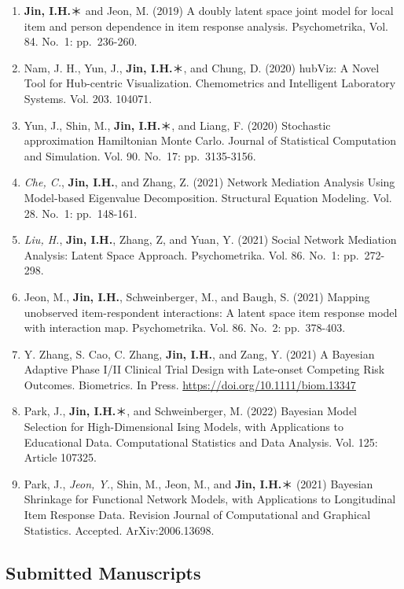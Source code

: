 \documentclass[
]{book}
\begin{document}
\begin{enumerate}
\item
  \textbf{Jin, I.H.}＊ and Jeon, M. (2019) A doubly latent space joint model for local item and person dependence in item response analysis. Psychometrika, Vol. 84. No.~1: pp.~236-260.
\item
  Nam, J. H., Yun, J., \textbf{Jin, I.H.}＊, and Chung, D. (2020) hubViz: A Novel Tool for Hub-centric Visualization. Chemometrics and Intelligent Laboratory Systems. Vol. 203. 104071.
\item
  Yun, J., Shin, M., \textbf{Jin, I.H.}＊, and Liang, F. (2020) Stochastic approximation Hamiltonian Monte Carlo. Journal of Statistical Computation and Simulation. Vol. 90. No.~17: pp.~3135-3156.
\item
  \emph{Che, C.}, \textbf{Jin, I.H.}, and Zhang, Z. (2021) Network Mediation Analysis Using Model-based Eigenvalue Decomposition. Structural Equation Modeling. Vol. 28. No.~1: pp.~148-161.
\item
  \emph{Liu, H.}, \textbf{Jin, I.H.}, Zhang, Z, and Yuan, Y. (2021) Social Network Mediation Analysis: Latent Space Approach. Psychometrika. Vol. 86. No.~1: pp.~272-298.
\item
  Jeon, M., \textbf{Jin, I.H.}, Schweinberger, M., and Baugh, S. (2021) Mapping unobserved item-respondent interactions: A latent space item response model with interaction map. Psychometrika. Vol. 86. No.~2: pp.~378-403.
\item
  Y. Zhang, S. Cao, C. Zhang, \textbf{Jin, I.H.}, and Zang, Y. (2021) A Bayesian Adaptive Phase I/II Clinical Trial Design with Late-onset Competing Risk Outcomes. Biometrics. In Press. \url{https://doi.org/10.1111/biom.13347}
\item
  Park, J., \textbf{Jin, I.H.}＊, and Schweinberger, M. (2022) Bayesian Model Selection for High-Dimensional Ising Models, with Applications to Educational Data. Computational Statistics and Data Analysis. Vol. 125: Article 107325.
\item
  Park, J., \emph{Jeon, Y.}, Shin, M., Jeon, M., and \textbf{Jin, I.H.}＊ (2021) Bayesian Shrinkage for Functional Network Models, with Applications to Longitudinal Item Response Data. Revision Journal of Computational and Graphical Statistics. Accepted. ArXiv:2006.13698.
\end{enumerate}

\hypertarget{submitted-manuscripts}{%
\subsection*{Submitted Manuscripts}\label{submitted-manuscripts}}
\end{document}
